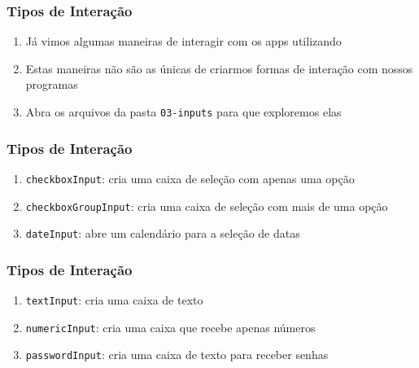 \documentclass[12pt, compress, usetitleprogressbar]{beamer}\usepackage[]{graphicx}\usepackage[]{color}
\begin{document}
\begin{frame}

\frametitle{Tipos de Interação}

\begin{enumerate}[label=$\bullet$, leftmargin=*]

  \item Já vimos algumas maneiras de interagir com os apps utilizando

  \item Estas maneiras não são as únicas de criarmos formas de interação com nossos programas

  \item Abra os arquivos da pasta \texttt{03-inputs} para que exploremos elas

\end{enumerate}

\end{frame}







\begin{frame}

\frametitle{Tipos de Interação}

\begin{enumerate}[label=$\bullet$, leftmargin=*]

  \item \texttt{checkboxInput}: cria uma caixa de seleção com apenas uma opção

  \item \texttt{checkboxGroupInput}: cria uma caixa de seleção com mais de uma opção

  \item \texttt{dateInput}: abre um calendário para a seleção de datas

\end{enumerate}

\end{frame}







\begin{frame}

\frametitle{Tipos de Interação}

\begin{enumerate}[label=$\bullet$, leftmargin=*]

  \item \texttt{textInput}: cria uma caixa de texto

  \item \texttt{numericInput}: cria uma caixa que recebe apenas números

  \item \texttt{passwordInput}: cria uma caixa de texto para receber senhas
  
\end{enumerate}

\end{frame}
\end{document}
